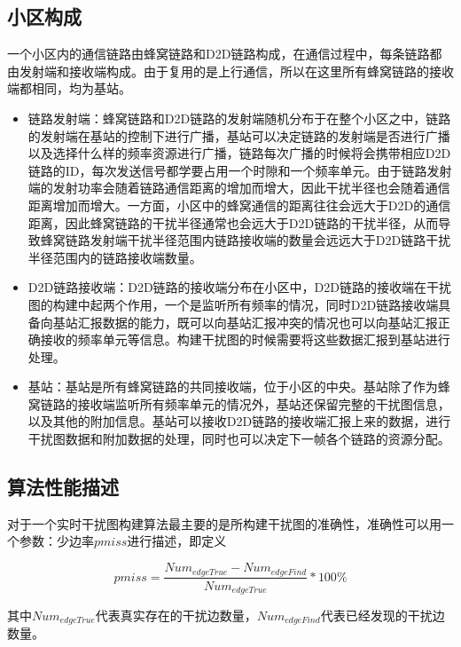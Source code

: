 \documentclass[figurelist,tablelist,algorithmlist,nomlist,masters]{seuthesix}
\begin{document}
	\subsection{小区构成}
	一个小区内的通信链路由蜂窝链路和D2D链路构成，在通信过程中，每条链路都由发射端和接收端构成。由于复用的是上行通信，所以在这里所有蜂窝链路的接收端都相同，均为基站。
	\begin{itemize}
	\item 链路发射端：蜂窝链路和D2D链路的发射端随机分布于在整个小区之中，链路的发射端在基站的控制下进行广播，基站可以决定链路的发射端是否进行广播以及选择什么样的频率资源进行广播，链路每次广播的时候将会携带相应D2D链路的ID，每次发送信号都学要占用一个时隙和一个频率单元。由于链路发射端的发射功率会随着链路通信距离的增加而增大，因此干扰半径也会随着通信距离增加而增大。一方面，小区中的蜂窝通信的距离往往会远大于D2D的通信距离，因此蜂窝链路的干扰半径通常也会远大于D2D链路的干扰半径，从而导致蜂窝链路发射端干扰半径范围内链路接收端的数量会远远大于D2D链路干扰半径范围内的链路接收端数量。

	\item D2D链路接收端：D2D链路的接收端分布在小区中，D2D链路的接收端在干扰图的构建中起两个作用，一个是监听所有频率的情况，同时D2D链路接收端具备向基站汇报数据的能力，既可以向基站汇报冲突的情况也可以向基站汇报正确接收的频率单元等信息。构建干扰图的时候需要将这些数据汇报到基站进行处理。

	\item 基站：基站是所有蜂窝链路的共同接收端，位于小区的中央。基站除了作为蜂窝链路的接收端监听所有频率单元的情况外，基站还保留完整的干扰图信息，以及其他的附加信息。基站可以接收D2D链路的接收端汇报上来的数据，进行干扰图数据和附加数据的处理，同时也可以决定下一帧各个链路的资源分配。
	
	\end{itemize}
	
	\subsection{算法性能描述}
	对于一个实时干扰图构建算法最主要的是所构建干扰图的准确性，准确性可以用一个参数：少边率$pmiss$进行描述，即定义
	
	
	
	\begin{equation}\label{eq2.1}
		{pmiss} = \frac{{Nu{m_{edgeTrue}} - Nu{m_{edgeFind}}}}{{Nu{m_{edgeTrue}}}}*100\% 
	\end{equation}
	
	其中$Nu{m_{edgeTrue}}$代表真实存在的干扰边数量，$Nu{m_{edgeFind}}$代表已经发现的干扰边数量。
	
\end{document}
